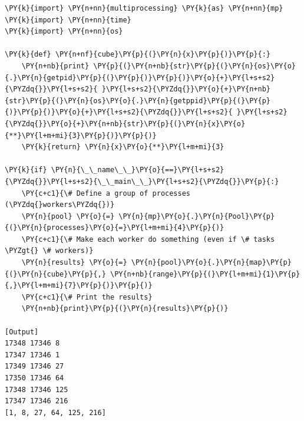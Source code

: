 \begin{Verbatim}[label=\makebox{\url{https://github.com/lucabaldini/cmepda/tree/master/slides/latex/snippets/multiprocessing_pool_map.py}},commandchars=\\\{\}]
\PY{k}{import} \PY{n+nn}{multiprocessing} \PY{k}{as} \PY{n+nn}{mp}
\PY{k}{import} \PY{n+nn}{time}
\PY{k}{import} \PY{n+nn}{os}

\PY{k}{def} \PY{n+nf}{cube}\PY{p}{(}\PY{n}{x}\PY{p}{)}\PY{p}{:}
    \PY{n+nb}{print} \PY{p}{(}\PY{n+nb}{str}\PY{p}{(}\PY{n}{os}\PY{o}{.}\PY{n}{getpid}\PY{p}{(}\PY{p}{)}\PY{p}{)}\PY{o}{+}\PY{l+s+s2}{\PYZdq{}}\PY{l+s+s2}{ }\PY{l+s+s2}{\PYZdq{}}\PY{o}{+}\PY{n+nb}{str}\PY{p}{(}\PY{n}{os}\PY{o}{.}\PY{n}{getppid}\PY{p}{(}\PY{p}{)}\PY{p}{)}\PY{o}{+}\PY{l+s+s2}{\PYZdq{}}\PY{l+s+s2}{ }\PY{l+s+s2}{\PYZdq{}}\PY{o}{+}\PY{n+nb}{str}\PY{p}{(}\PY{n}{x}\PY{o}{**}\PY{l+m+mi}{3}\PY{p}{)}\PY{p}{)}
    \PY{k}{return} \PY{n}{x}\PY{o}{**}\PY{l+m+mi}{3}

\PY{k}{if} \PY{n}{\_\_name\_\_}\PY{o}{==}\PY{l+s+s2}{\PYZdq{}}\PY{l+s+s2}{\_\_main\_\_}\PY{l+s+s2}{\PYZdq{}}\PY{p}{:}
    \PY{c+c1}{\# Define a group of processes (\PYZdq{}workers\PYZdq{})}
    \PY{n}{pool} \PY{o}{=} \PY{n}{mp}\PY{o}{.}\PY{n}{Pool}\PY{p}{(}\PY{n}{processes}\PY{o}{=}\PY{l+m+mi}{4}\PY{p}{)}
    \PY{c+c1}{\# Make each worker do something (even if \# tasks \PYZgt{} \# workers)}
    \PY{n}{results} \PY{o}{=} \PY{n}{pool}\PY{o}{.}\PY{n}{map}\PY{p}{(}\PY{n}{cube}\PY{p}{,} \PY{n+nb}{range}\PY{p}{(}\PY{l+m+mi}{1}\PY{p}{,}\PY{l+m+mi}{7}\PY{p}{)}\PY{p}{)}
    \PY{c+c1}{\# Print the results}
    \PY{n+nb}{print}\PY{p}{(}\PY{n}{results}\PY{p}{)}

[Output]
17348 17346 8
17347 17346 1
17349 17346 27
17350 17346 64
17348 17346 125
17347 17346 216
[1, 8, 27, 64, 125, 216]
\end{Verbatim}